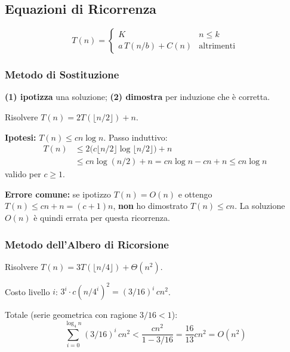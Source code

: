\subsection{Equazioni di Ricorrenza}

\begin{definizione}
	\[
	T(n) =
	\begin{cases}
		K             & n \le k \\
		a\,T(n/b)+C(n)& \text{altrimenti}
	\end{cases}
	\]
\end{definizione}

\subsubsection{Metodo di Sostituzione}

\begin{softnote}
	\textbf{(1) ipotizza} una soluzione; \textbf{(2) dimostra}
	per induzione che è corretta.
\end{softnote}

\begin{esempio}
	Risolvere $T(n) = 2T\!\left(\lfloor n/2 \rfloor\right) + n$.
	
	\textbf{Ipotesi:} $T(n) \le cn\log n$. Passo induttivo:
	\begin{align*}
		T(n) &\le 2\bigl(c\lfloor n/2\rfloor \log\lfloor n/2\rfloor\bigr) + n \\
		&\le cn\log(n/2) + n = cn\log n - cn + n \le cn\log n
	\end{align*}
	valido per $c \ge 1$. \checkmark
\end{esempio}

\begin{hardnote}
	\textbf{Errore comune:} se ipotizzo $T(n) = O(n)$ e ottengo
	$T(n) \le cn + n = (c+1)n$, \textbf{non} ho dimostrato $T(n) \le cn$.
	La soluzione $O(n)$ è quindi errata per questa ricorrenza.
\end{hardnote}

\subsubsection{Metodo dell'Albero di Ricorsione}

\begin{esempio}
	Risolvere $T(n) = 3T(\lfloor n/4 \rfloor) + \Theta(n^2)$.
	
	Costo livello $i$: $3^i \cdot c(n/4^i)^2 = (3/16)^i\,cn^2$.
	
	Totale (serie geometrica con ragione $3/16 < 1$):
	\[
	\sum_{i=0}^{\log_4 n}(3/16)^i\,cn^2
	< \frac{cn^2}{1-3/16} = \frac{16}{13}cn^2 = O(n^2)
	\]
\end{esempio}

